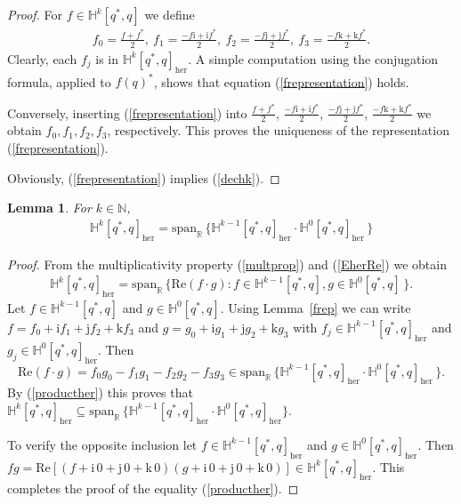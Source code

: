 \documentclass[11pt,a4paper]{amsart}
\newtheorem{lemma}[theorem]{Lemma}
\theoremstyle{definition}
\begin{document}
%
\begin{proof}
For $f\in \mathbb{H}^{k}[q^{*},q]$ we define
%
\begin{align*}
f_{0}=\frac{f+f^{*}}{2}, ~ f_{1}=
\frac{-f\mathrm{i}+\mathrm{i}f^{*}}{2}, ~f_{2}=
\frac{-f\mathrm{j}+ \mathrm{j}f^{*}}{2},~ f_{3}=
\frac{-f\mathrm{k}+ \mathrm{k}f^{*}}{2}.
\end{align*}
%
Clearly, each $f_{j}$ is in $\mathbb{H}^{k}[q^{*},q]_{\mathrm{her}}$. A
simple computation using the conjugation formula, applied to
$f(q)^{*}$, shows that equation (\ref{frepresentation}) holds.

Conversely, inserting (\ref{frepresentation}) into
$\frac{f+f^{*}}{2}$, $\frac{-f\mathrm{i}+\mathrm{i}f^{*}}{2}$, $\frac{-f\mathrm{j}+ \mathrm{j}f^{*}}{2}$,  $\frac{-f\mathrm{k}+ \mathrm{k}f^{*}}{2}$  we obtain
$f_{0}, f_{1}, f_{2}, f_{3}$, respectively. This proves the uniqueness
of the representation (\ref{frepresentation}).

Obviously, (\ref{frepresentation}) implies (\ref{dechk}).
\end{proof}
%
\begin{lemma}
\label{lem4.10}
For $k\in \mathbb{N}$,
%
\begin{align}
\label{multher}
\mathbb{H}^{k}[q^{*},q]_{\mathrm{her}}=\mathrm{span}_{\mathbb{R}}\,
\{\mathbb{H}^{k-1}[q^{*},q]_{\mathrm{her}}\cdot \mathbb{H}^{0}[q^{*},q]_{
\mathrm{her}} \, \}
\end{align}
%
\end{lemma}
%
\begin{proof}
From the multiplicativity property (\ref{multprop}) and (\ref{EherRe})
we obtain
%
\begin{align}
\label{producther}
\mathbb{H}^{k}[q^{*},q]_{\mathrm{her}}={\mathrm{span}}_{\mathbb{R}}\,
\big\{ \mathrm{Re}(f\cdot g): f\in \mathbb{H}^{k-1}[q^{*},q], g\in
\mathbb{H}^{0}[q^{*},q] \, \big\}.
\end{align}
%
Let $ f\in \mathbb{H}^{k-1}[q^{*},q] $ and
$ g\in \mathbb{H}^{0}[q^{*},q] $. Using Lemma~\ref{frep} we can write
$f=f_{0}+\mathrm{i}f_{1}+\mathrm{j}f_{2}+\mathrm{k}f_{3}$ and
$g=g_{0}+\mathrm{i}g_{1}+\mathrm{j}g_{2}+\mathrm{k}g_{3}$ with
$ f_{j}\in \mathbb{H}^{k-1}[q^{*},q]_{\mathrm{her}} $ and
$ g_{j}\in \mathbb{H}^{0}[q^{*},q]_{\mathrm{her}} $. Then
%
\begin{equation*}
\mathrm{Re}(f\cdot g)= f_{0}g_{0}-f_{1}g_{1}-f_{2}g_{2}-f_{3}g_{3}
\in \mathrm{span}_{\mathbb{R}}\, \{\mathbb{H}^{k-1}[q^{*},q]_{
\mathrm{her}}\cdot \mathbb{H}^{0}[q^{*},q]_{\mathrm{her}} \, \}.
\end{equation*}
%
By (\ref{producther}) this proves that
$ \mathbb{H}^{k}[q^{*},q]_{\mathrm{her}}\subseteq \mathrm{span}_{
\mathbb{R}}\, \{\mathbb{H}^{k-1}[q^{*},q]_{\mathrm{her}}\cdot
\mathbb{H}^{0}[q^{*},q]_{\mathrm{her}} \}$.

To verify the opposite inclusion let
$ f\in \mathbb{H}^{k-1}[q^{*},q]_{\mathrm{her}}$ and
$ g\in \mathbb{H}^{0}[q^{*},q]_{\mathrm{her}}$. Then
$fg=\mathrm{Re}[ (f+\mathrm{i}\, 0 +\mathrm{j}\, 0+\mathrm{k}\, 0)(g+
\mathrm{i}\,0+\mathrm{j}\, 0+\mathrm{k}\,0)]\in \mathbb{H}^{k}[q^{*},q]_{
\mathrm{her}}$. This completes the proof of the equality (\ref{producther}).
\end{proof}
\end{document}
